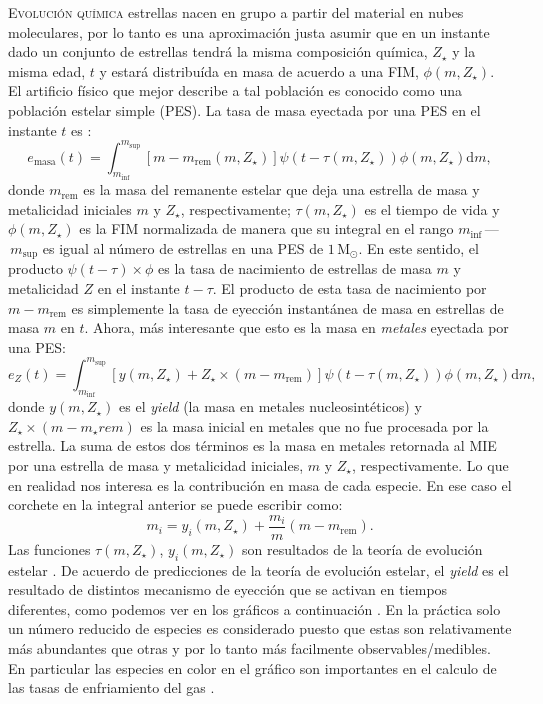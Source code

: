 \documentclass[xcolor=dvipsnames,4pt,hyperref={colorlinks,citecolor=black,linkcolor=black,urlcolor=black}]{beamer}
\begin{document}
\begin{frame}[allowframebreaks]{\textsc{Evolución química}}
estrellas nacen en grupo a partir del material en nubes moleculares, por lo tanto es una
aproximación justa asumir que en un instante dado un conjunto de estrellas tendrá la misma
composición química, $Z_\star$ y la misma edad, $t$ y estará distribuída en masa de acuerdo a una
FIM, $\phi(m,Z_\star)$. El artificio físico que mejor describe a tal población es conocido como una
población estelar simple (PES). La tasa de masa eyectada por una PES en el instante $t$ es
\citep{Yates2013}:
%
$$
e_\text{masa}(t) = \int_{m_\text{inf}}^{m_\text{sup}}\left[m-m_\text{rem}(m,Z_\star)\right]\psi(t-\tau(m,Z_\star))\phi(m,Z_\star)\text{d}m,
$$
%
donde $m_\text{rem}$ es la masa del remanente estelar que deja una estrella de masa y metalicidad
iniciales $m$ y $Z_\star$, respectivamente; $\tau(m,Z_\star)$ es el tiempo de vida y
$\phi(m,Z_\star)$ es la FIM normalizada de manera que su integral en el rango
$m_\text{inf}\,$---$\,m_\text{sup}$ es igual al número de estrellas en una PES de $1\,$M$_\odot$. En
este sentido, el producto $\psi(t-\tau)\times\phi$ es la tasa de nacimiento de estrellas de masa $m$
y metalicidad $Z$ en el instante $t-\tau$. El producto de esta tasa de nacimiento por
$m-m_\text{rem}$ es simplemente la tasa de eyección instantánea de masa en estrellas de masa $m$ en
$t$. Ahora, más interesante que esto es la masa en \emph{metales} eyectada por una PES:
%
$$
e_Z(t) = \int_{m_\text{inf}}^{m_\text{sup}}\left[y(m,Z_\star)+Z_\star\times(m-m_\text{rem})\right]\psi(t-\tau(m,Z_\star))\phi(m,Z_\star)\text{d}m,
$$
%
donde $y(m,Z_\star)$ es el \emph{yield} (la masa en metales nucleosintéticos) y
$Z_\star\times(m-m_\star{rem})$ es la masa inicial en metales que no fue procesada por la estrella.
La suma de estos dos términos es la masa en metales retornada al MIE por una estrella de masa y
metalicidad iniciales, $m$ y $Z_\star$, respectivamente. Lo que en realidad nos interesa es la
contribución en masa de cada especie. En ese caso el corchete en la integral anterior se puede
escribir como:
%
$$
m_i = y_i(m,Z_\star) + \frac{m_i}{m}(m-m_\text{rem}).
$$
%
Las funciones $\tau(m,Z_\star)$, $y_i(m,Z_\star)$ son resultados de la teoría de evolución estelar
\citep[e.\,g.][]{Portinari1998, Marigo2001}.
De acuerdo de predicciones de la teoría de evolución estelar, el \emph{yield} es el resultado de
distintos mecanismo de eyección que se activan en tiempos diferentes, como podemos ver en los
gráficos a continuación \citep{Yates2013}.
En la práctica solo un número reducido de especies es considerado puesto que estas son relativamente
más abundantes que otras y por lo tanto más facilmente observables/medibles. En particular las
especies en color en el gráfico son importantes en el calculo de las tasas de enfriamiento del gas
\citep{Wiersma2009a}.
%
\end{frame}
\end{document}
